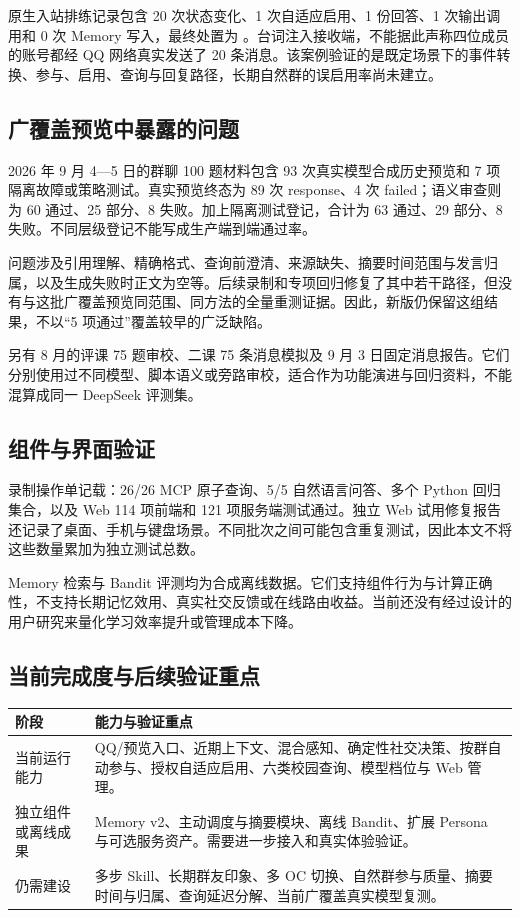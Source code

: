 原生入站排练记录包含 20 次状态变化、1 次自适应启用、1 份回答、1 次输出调用和 0 次 Memory 写入，最终处置为 。台词注入接收端，不能据此声称四位成员的账号都经 QQ 网络真实发送了 20 条消息。该案例验证的是既定场景下的事件转换、参与、启用、查询与回复路径，长期自然群的误启用率尚未建立。

\subsection{广覆盖预览中暴露的问题}
2026 年 9 月 4—5 日的群聊 100 题材料包含 93 次真实模型合成历史预览和 7 项隔离故障或策略测试。真实预览终态为 89 次 response、4 次 failed；语义审查则为 60 通过、25 部分、8 失败。加上隔离测试登记，合计为 63 通过、29 部分、8 失败。不同层级登记不能写成生产端到端通过率。

问题涉及引用理解、精确格式、查询前澄清、来源缺失、摘要时间范围与发言归属，以及生成失败时正文为空等。后续录制和专项回归修复了其中若干路径，但没有与这批广覆盖预览同范围、同方法的全量重测证据。因此，新版仍保留这组结果，不以“5 项通过”覆盖较早的广泛缺陷。

另有 8 月的评课 75 题审校、二课 75 条消息模拟及 9 月 3 日固定消息报告。它们分别使用过不同模型、脚本语义或旁路审校，适合作为功能演进与回归资料，不能混算成同一 DeepSeek 评测集。

\subsection{组件与界面验证}
录制操作单记载：26/26 MCP 原子查询、5/5 自然语言问答、多个 Python 回归集合，以及 Web 114 项前端和 121 项服务端测试通过。独立 Web 试用修复报告还记录了桌面、手机与键盘场景。不同批次之间可能包含重复测试，因此本文不将这些数量累加为独立测试总数。

Memory 检索与 Bandit 评测均为合成离线数据。它们支持组件行为与计算正确性，不支持长期记忆效用、真实社交反馈或在线路由收益。当前还没有经过设计的用户研究来量化学习效率提升或管理成本下降。

\subsection{当前完成度与后续验证重点}
\begin{tabularx}{\textwidth}{@{}L{34mm}Y@{}}\toprule
阶段 & 能力与验证重点\\\midrule
当前运行能力 & QQ/预览入口、近期上下文、混合感知、确定性社交决策、按群自动参与、授权自适应启用、六类校园查询、模型档位与 Web 管理。\\
独立组件或离线成果 & Memory v2、主动调度与摘要模块、离线 Bandit、扩展 Persona 与可选服务资产。需要进一步接入和真实体验验证。\\
仍需建设 & 多步 Skill、长期群友印象、多 OC 切换、自然群参与质量、摘要时间与归属、查询延迟分解、当前广覆盖真实模型复测。\\\bottomrule
\end{tabularx}
